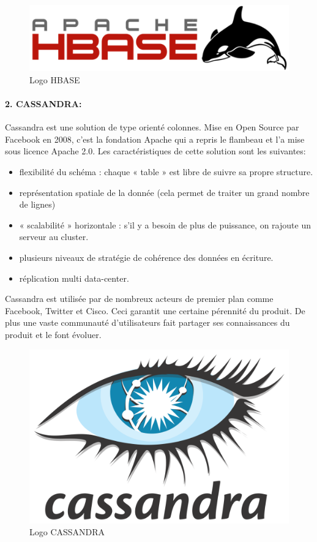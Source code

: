 \begin{figure}[h]
	\centering
    \includegraphics[scale=0.4]{img/part1/4.9}
    \caption{Logo HBASE}
\end{figure}

\paragraph{2. CASSANDRA:}
Cassandra est une solution de type orienté colonnes. Mise en Open Source par Facebook en 2008, c’est la fondation Apache qui a repris le flambeau et l’a mise sous licence Apache 2.0. Les caractéristiques de cette solution sont les suivantes:

\begin{itemize}[label=]
\item flexibilité du schéma : chaque « table » est libre de suivre sa propre structure.
\item représentation spatiale de la donnée (cela permet de traiter un grand nombre de lignes)
\item « scalabilité » horizontale : s’il y a besoin de plus de puissance, on rajoute un serveur au cluster.
\item plusieurs niveaux de stratégie de cohérence des données en écriture.
\item réplication multi data-center.
\end{itemize}

Cassandra est utilisée par de nombreux acteurs de premier plan comme Facebook, Twitter et Cisco. Ceci garantit une certaine pérennité du produit. De plus une vaste communauté d’utilisateurs fait partager ses connaissances du produit et le font évoluer.

\begin{figure}[h]
	\centering
    \includegraphics[scale=0.1]{img/part1/4.10}
    \caption{Logo CASSANDRA}
\end{figure}

